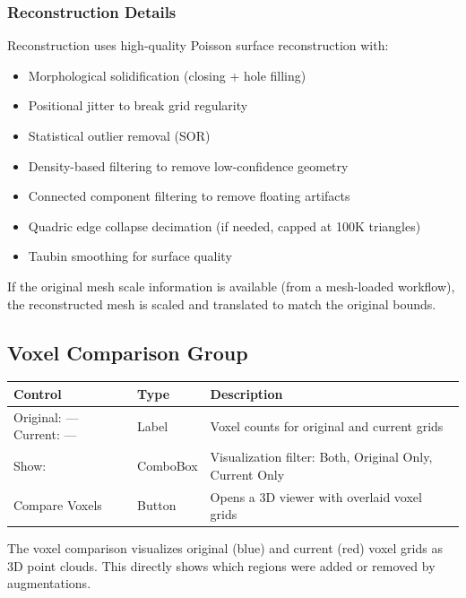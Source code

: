 \documentclass[12pt,a4paper]{article}
\begin{document}
\subsubsection{Reconstruction Details}
Reconstruction uses high-quality Poisson surface reconstruction with:
\begin{itemize}
  \item Morphological solidification (closing + hole filling)
  \item Positional jitter to break grid regularity
  \item Statistical outlier removal (SOR)
  \item Density-based filtering to remove low-confidence geometry
  \item Connected component filtering to remove floating artifacts
  \item Quadric edge collapse decimation (if needed, capped at 100K triangles)
  \item Taubin smoothing for surface quality
\end{itemize}

If the original mesh scale information is available (from a mesh-loaded workflow), the reconstructed mesh is scaled and translated to match the original bounds.

\subsection{Voxel Comparison Group}

\begin{table}[H]
\centering
\begin{tabular}{llp{7cm}}
\toprule
\textbf{Control} & \textbf{Type} & \textbf{Description} \\
\midrule
Original: --- Current: --- & Label & Voxel counts for original and current grids \\
Show: & ComboBox & Visualization filter: Both, Original Only, Current Only \\
Compare Voxels & Button & Opens a 3D viewer with overlaid voxel grids \\
\bottomrule
\end{tabular}
\end{table}

The voxel comparison visualizes original (blue) and current (red) voxel grids as 3D point clouds. This directly shows which regions were added or removed by augmentations.

\end{document}

